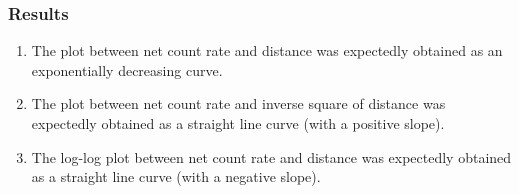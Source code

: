 \documentclass[%
 reprint,
nofootinbib,
 amsmath,amssymb,
 aps,
floatfix,
]{revtex4-2}
\begin{document}
        \subsubsection{Results}
        \begin{enumerate}
            \item The plot between net count rate and distance was expectedly obtained as an exponentially decreasing curve.
            \item The plot between net count rate and inverse square of distance was expectedly obtained as a straight line curve (with a positive slope).
            \item The log-log plot between net count rate and distance was expectedly obtained as a straight line curve (with a negative slope).
        \end{enumerate}
\end{document}
